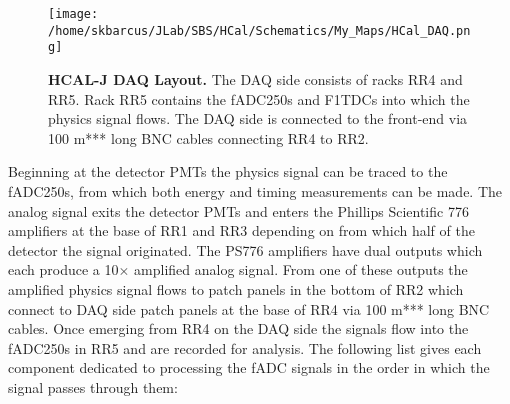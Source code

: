 \documentclass[review]{elsarticle}
\newcommand{\hcal}{HCAL-J }
\begin{document}
	\begin{figure}[!ht]
	\begin{center}
	\texttt{[image: /home/skbarcus/JLab/SBS/HCal/Schematics/My\_Maps/HCal\_DAQ.png]}
	\end{center}
	\caption{
	{\bf{\hcal DAQ Layout.}} The DAQ side consists of racks RR4 and RR5. Rack RR5 contains the fADC250s and F1TDCs into which the physics signal flows. The DAQ side is connected to the front-end via 100 m*** long BNC cables connecting RR4 to RR2.}
	\label{fig:daq}
	\end{figure}	

Beginning at the detector PMTs the physics signal can be traced to the fADC250s, from which both energy and timing measurements can be made. The analog signal exits the detector PMTs and enters the Phillips Scientific 776 amplifiers at the base of RR1 and RR3 depending on from which half of the detector the signal originated. The PS776 amplifiers have dual outputs which each produce a 10$\times$ amplified analog signal. From one of these outputs the amplified physics signal flows to patch panels in the bottom of RR2 which connect to DAQ side patch panels at the base of RR4 via 100 m*** long BNC cables. Once emerging from RR4 on the DAQ side the signals flow into the fADC250s in RR5 and are recorded for analysis. The following list gives each component dedicated to processing the fADC signals in the order in which the signal passes through them:\\
\end{document}
